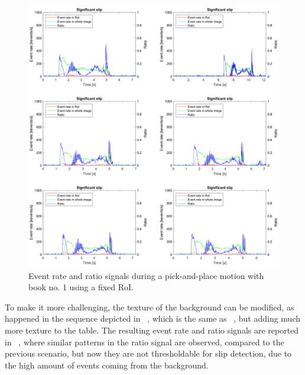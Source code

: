 \begin{figure}[h]
    \centering
    \includegraphics[width=\textwidth]{resources/images/fix_roi_book1}
    \caption{Event rate and ratio signals during a pick-and-place motion with book no. 1 using a fixed RoI.}\label{fig:fix_roi_book1}
\end{figure}

To make it more challenging, the texture of the background can be modified, as happened in the sequence depicted in ~, which is the same as ~, but adding much more texture to the table. The resulting event rate and ratio signals are reported in ~, where similar patterns in the ratio signal are observed, compared to the previous scenario, but now they are not thresholdable for slip detection, due to the high amount of events coming from the background.\\

